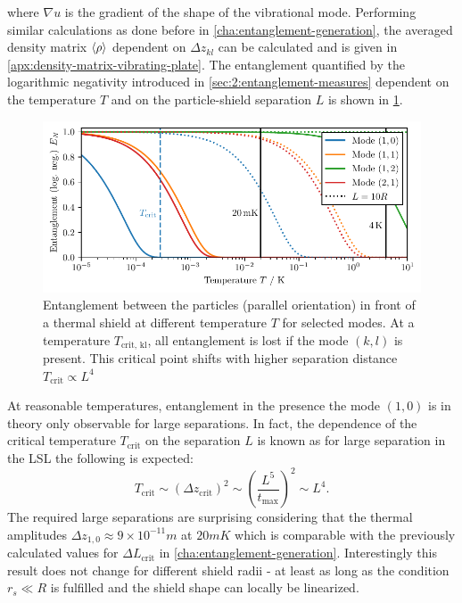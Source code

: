 where $\nabla u$ is the gradient of the shape of the vibrational mode.
Performing similar calculations as done before in \cref{cha:entanglement-generation}, the averaged density matrix $\left\langle\rho\right\rangle$ dependent on $\Delta z_{kl}$ can be calculated and is given in \cref{apx:density-matrix-vibrating-plate}.
The entanglement quantified by the logarithmic negativity \cite{Plenio_2005} introduced in \cref{sec:2:entanglement-measures} dependent on the temperature $T$ and on the particle-shield separation $L$ is shown in \cref{fig:5:entanglement-temperature}.
\begin{figure}[!htbp]
  \centering
  \includegraphics[width=\textwidth]{./../figures/vibrations/log-neg-shield-vibrations-T.pdf}
  \caption{Entanglement between the particles (parallel orientation) in front of a thermal shield at different temperature $T$ for selected modes. At a temperature $T_\mathrm{crit,\,kl}$, all entanglement is lost if the mode $(k,l)$ is present. This critical point shifts with higher separation distance $T_\mathrm{crit}\propto L^4$}
  \label{fig:5:entanglement-temperature}
\end{figure}
At reasonable temperatures, entanglement in the presence the mode $(1,0)$ is in theory only observable for large separations.
In fact, the dependence of the critical temperature $T_\mathrm{crit}$ on the separation $L$ is known as for large separation in the LSL the following is expected:
\begin{equation}
  T_\mathrm{crit} \sim (\Delta z_\mathrm{crit})^2 \sim \left(\frac{L^5}{t_\mathrm{max}} \right)^2 \sim L^4 .
\end{equation}
The required large separations are surprising considering that the thermal amplitudes $\Delta z_{1,0} \approx 9 \times 10^{-11}\si{m}$ at $20\si{mK}$ which is comparable with the previously calculated values for $\Delta L_\mathrm{crit}$ in \cref{cha:entanglement-generation}.
Interestingly this result does not change for different shield radii - at least as long as the condition $r_s \ll R$ is fulfilled and the shield shape can locally be linearized.
